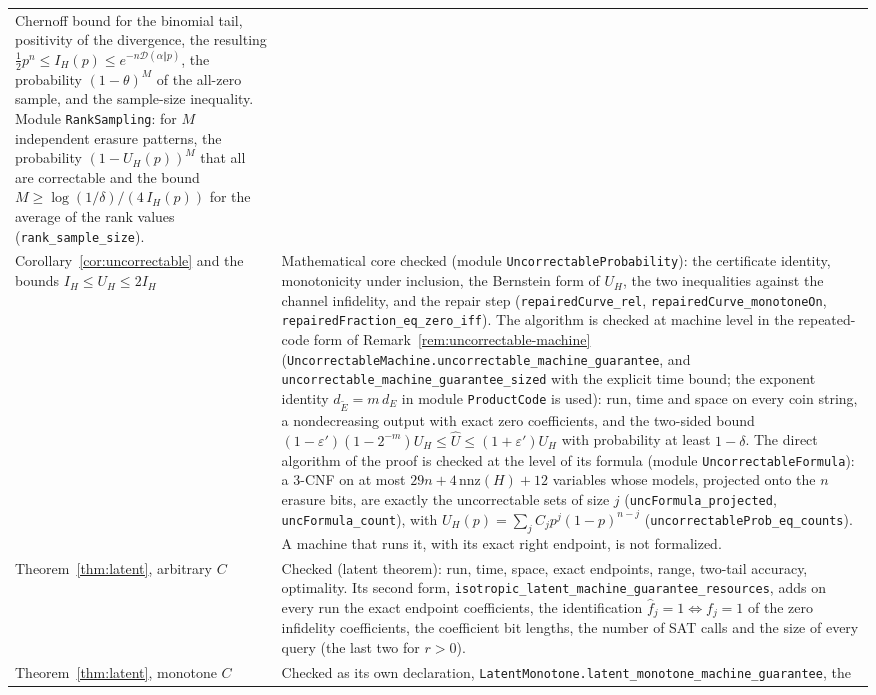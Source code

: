 \documentclass[11pt]{article}
\theoremstyle{remark}
\newcommand{\eps}{\varepsilon}
\newcommand{\lean}[1]{\texttt{#1}}
\begin{document}
{\begin{longtable}{@{}p{}p{}@{}}
Chernoff bound for the binomial tail, positivity of the divergence, the
resulting \(\tfrac12p^n\le I_H(p)\le e^{-n\mathcal D(\alpha\Vert p)}\),
the probability \((1-\theta)^M\) of the all-zero sample, and the
sample-size inequality. Module \lean{RankSampling}: for \(M\)
independent erasure patterns, the probability
\((1-U_H(p))^M\) that all are correctable and the bound
\(M\ge\log(1/\delta)/(4\,I_H(p))\) for the average of the rank values
(\lean{rank\_sample\_size}).\\
Corollary~\ref{cor:uncorrectable} and the bounds
\(I_H\le U_H\le2I_H\) &
Mathematical core checked (module \lean{UncorrectableProbability}): the
certificate identity, monotonicity under inclusion, the Bernstein form
of \(U_H\), the two inequalities against the channel infidelity, and
the repair step (\lean{repairedCurve\_rel},
\lean{repairedCurve\_monotoneOn}, \lean{repairedFraction\_eq\_zero\_iff}).
The algorithm is checked at machine level in the repeated-code form of
Remark~\ref{rem:uncorrectable-machine}
(\lean{UncorrectableMachine.uncorrectable\_machine\_guarantee}, and
\lean{uncorrectable\_machine\_guarantee\_sized} with the explicit time
bound; the
exponent identity \(d_{\widetilde E}=m\,d_E\) in module
\lean{ProductCode} is used): run, time and space on every coin string, a
nondecreasing output with exact zero coefficients, and the two-sided
bound \((1-\eps')(1-2^{-m})U_H\le\widehat U\le(1+\eps')U_H\) with
probability at least \(1-\delta\). The direct algorithm of the proof
is checked at the level of its formula (module
\lean{UncorrectableFormula}): a 3-CNF on at most
\(29n+4\,\mathrm{nnz}(H)+12\) variables whose models, projected onto
the \(n\) erasure bits, are exactly the uncorrectable sets of size \(j\)
(\lean{uncFormula\_projected}, \lean{uncFormula\_count}), with
\(U_H(p)=\sum_jC_jp^j(1-p)^{n-j}\)
(\lean{uncorrectableProb\_eq\_counts}). A machine that runs it, with
its exact right endpoint, is not formalized.\\
Theorem~\ref{thm:latent}, arbitrary \(C\) &
Checked (latent theorem): run, time, space, exact endpoints, range,
two-tail accuracy, optimality. Its second form,
\lean{isotropic\_latent\_machine\_guarantee\_resources}, adds on every
run the exact endpoint coefficients, the identification
\(\widehat f_j=1\Leftrightarrow f_j=1\) of the zero infidelity
coefficients, the coefficient bit lengths, the number of SAT calls and
the size of every query (the last two for \(r>0\)).\\
Theorem~\ref{thm:latent}, monotone \(C\) &
Checked as its own declaration,
\lean{LatentMonotone.latent\_monotone\_machine\_guarantee}, the

\end{longtable}}
\end{document}
